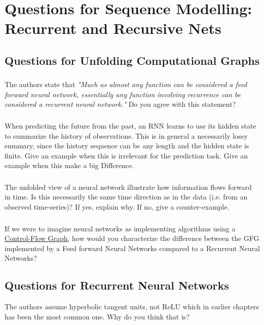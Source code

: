 \documentclass[a4paper]{report}
\begin{document}
\chapter{Questions for Sequence Modelling: Recurrent and Recursive Nets}

\section{Questions for Unfolding Computational Graphs}

  \subsection{} The authors state that \textit{"Much as almost any function can be considered a feed forward neural network, essentially any function involving recurrence can be considered a recurrent neural network."} Do you agree with this statement?
  \subsection{} When predicting the future from the past, an RNN learns to use its hidden state to summarize the history of observations. This is in general a necessarily lossy summary, since the history sequence can be any length and the hidden state is finite. Give an example when this is irrelevant for the prediction task. Give an example when this make a big Difference.
    \subsection{}  The unfolded view of a neural network illustrate how information flows forward in time. Is this necessarily the same time direction as in the data (i.e. from an observed time-series)? If yes, explain why. If no, give a counter-example.
    \subsection{}  If we were to imagine neural networks as implementing algorithms using a \href{https://en.wikipedia.org/wiki/Control-flow_graph}{Control-Flow Graph}, how would you characterize the difference between the GFG implemented by a Feed forward Neural Networks compared to a Recurrent Neural Networks?

\section{Questions for Recurrent Neural Networks}
{} The authors assume hyperbolic tangent units, not ReLU which in earlier chapters has been the most common one. Why do you think that is?
\end{document}
